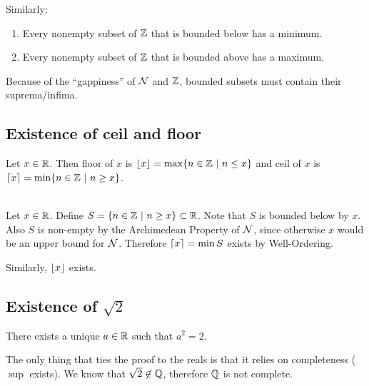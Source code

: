\begin{remark*}
  Similarly:
  \begin{enumerate}
    \item Every nonempty subset of $\mathbb{Z}$ that is bounded below has a minimum.
    \item Every nonempty subset of $\mathbb{Z}$ that is bounded above has a maximum.
  \end{enumerate}
\end{remark*}

\begin{intuition*}
  Because of the ``gappiness'' of $\mathcal{N}$ and $\mathbb{Z}$, bounded subsets must contain their suprema/infima.
\end{intuition*}

\subsection{Existence of ceil and floor}
\begin{definition*}
  Let $x \in \mathbb{R}$. Then floor of $x$ is $\lfloor x\rfloor = \max\{n \in \mathbb{Z} ~|~ n \leq x\}$ and ceil of $x$
  is $\lceil x\rceil = \min\{n \in \mathbb{Z} ~|~ n \geq x\}$.
\end{definition*}

\begin{theorem*}~\\
  Let $x \in \mathbb{R}$. Define $S = \{n \in \mathbb{Z} ~|~ n \geq x\} \subset \mathbb{R}$. Note that $S$ is bounded below
  by $x$. Also $S$ is non-empty by the Archimedean Property of $\mathcal{N}$, since otherwise $x$ would be
  an upper bound for $\mathcal{N}$. Therefore $\lceil x\rceil = \min S$ exists by Well-Ordering.

  Similarly, $\lfloor x\rfloor$ exists.
\end{theorem*}

\subsection{Existence of $\sqrt 2$}
\begin{theorem*}\label{existence-of-root-2}
  There exists a unique $a \in \mathbb{R}$ such that $a^2 = 2$.
\end{theorem*}

\begin{remark*}
  The only thing that ties the proof to the reals is that it relies on completeness ($\sup$
  exists). We know that $\sqrt 2 \not\in \mathbb{Q}$, therefore $\mathbb{Q}$ is not complete.
\end{remark*}


